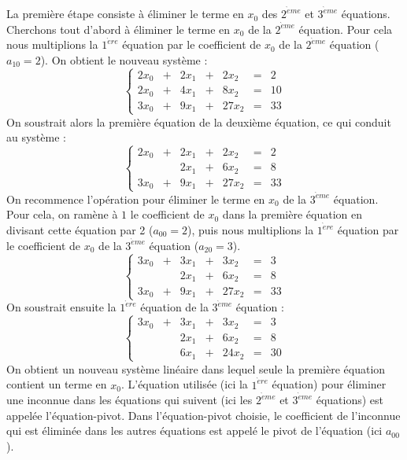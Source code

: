 La première étape consiste à éliminer le terme en $x_0$ des 
$2^{\grave eme}$ et $3^{\grave eme}$ équations.
Cherchons tout d'abord à éliminer le terme en $x_0$ de la $2^{\grave eme}$
équation. Pour cela nous multiplions la $1^{\grave ere}$ équation par le 
coefficient de $x_0$ de la $2^{\grave eme}$ équation ($a_{10} = 2$). 
On obtient le nouveau système :
$$\left\{
\begin{array}{rcrcrcr}
2x_0 & + & 2x_1 & + &  2x_2 & = &  2 \\
2x_0 & + & 4x_1 & + &  8x_2 & = & 10 \\
3x_0 & + & 9x_1 & + & 27x_2 & = & 33
\end{array}
\right.$$
On soustrait alors la première équation de la deuxième équation, 
ce qui conduit au système :
$$\left\{
\begin{array}{rcrcrcr}
2x_0 & + & 2x_1 & + &  2x_2 & = &  2 \\
     &   & 2x_1 & + &  6x_2 & = &  8 \\
3x_0 & + & 9x_1 & + & 27x_2 & = & 33
\end{array}
\right.$$
On recommence l'opération pour éliminer le terme en $x_0$ de la $3^{\grave eme}$
équation. Pour cela, on ramène à $1$ le coefficient de $x_0$ dans
la première équation en divisant cette équation par 2 ($a_{00} = 2$),
puis nous multiplions la $1^{\grave ere}$ équation par le 
coefficient de $x_0$ de la $3^{\grave eme}$ équation ($a_{20} = 3$). 
$$\left\{
\begin{array}{rcrcrcr}
3x_0 & + & 3x_1 & + &  3x_2 & = &  3 \\
     &   & 2x_1 & + &  6x_2 & = &  8 \\
3x_0 & + & 9x_1 & + & 27x_2 & = & 33
\end{array}
\right.$$
On soustrait ensuite la $1^{\grave ere}$ équation de la $3^{\grave eme}$ équation :
$$\left\{
\begin{array}{rcrcrcr}
3x_0 & + & 3x_1 & + &  3x_2 & = &  3 \\
     &   & 2x_1 & + &  6x_2 & = &  8 \\
     &   & 6x_1 & + & 24x_2 & = & 30
\end{array}
\right.$$
On obtient un nouveau système linéaire dans lequel seule la première équation contient
un terme en $x_0$.
L'équation utilisée (ici la $1^{\grave ere}$ équation) pour éliminer une inconnue 
dans les équations qui suivent (ici les $2^{\grave eme}$ et $3^{\grave eme}$ équations)
est appelée l'équation-pivot. Dans l'équation-pivot choisie, le coefficient de 
l'inconnue qui est éliminée dans les autres équations est appelé le pivot de
l'équation (ici $a_{00}$).

